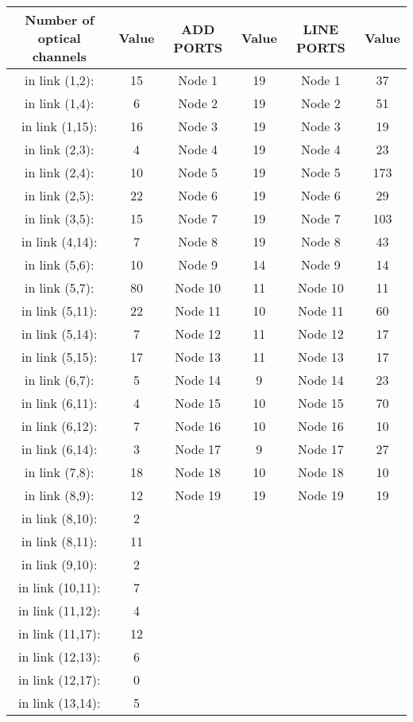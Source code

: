 \begin{table}[h!]
\centering
\begin{tabular}{|| c | c || c | c || c | c ||}
 \hline
 Number of optical channels & Value & ADD PORTS & Value & LINE PORTS & Value \\
 \hline\hline
in link (1,2): & 15& Node 1 & 19 & Node 1 & 37 \\
in link (1,4): & 6& Node 2 & 19 & Node 2 & 51 \\
in link (1,15): & 16& Node 3 & 19 & Node 3 & 19 \\
in link (2,3): & 4& Node 4 & 19 & Node 4 & 23 \\
in link (2,4): & 10& Node 5 & 19 & Node 5 & 173 \\
in link (2,5): & 22& Node 6 & 19 & Node 6 & 29 \\
in link (3,5): & 15& Node 7 & 19 & Node 7 & 103 \\
in link (4,14): & 7& Node 8 & 19 & Node 8 & 43 \\
in link (5,6): & 10& Node 9 & 14 & Node 9 & 14 \\
in link (5,7): & 80& Node 10 & 11 & Node 10 & 11 \\
in link (5,11): & 22& Node 11 & 10 & Node 11 & 60 \\
in link (5,14): & 7& Node 12 & 11 & Node 12 & 17 \\
in link (5,15): & 17& Node 13 & 11 & Node 13 & 17 \\
in link (6,7): & 5& Node 14 & 9 & Node 14 & 23 \\
in link (6,11): & 4& Node 15 & 10 & Node 15 & 70 \\
in link (6,12): & 7& Node 16 & 10 & Node 16 & 10 \\
in link (6,14): & 3& Node 17 & 9 & Node 17 & 27 \\
in link (7,8): & 18& Node 18 & 10 & Node 18 & 10 \\
in link (8,9): & 12& Node 19 & 19 & Node 19 & 19 \\
in link (8,10): & 2& & & & \\
in link (8,11): & 11& & & & \\
in link (9,10): & 2& & & & \\
in link (10,11): & 7& & & & \\
in link (11,12): & 4& & & & \\
in link (11,17): & 12& & & & \\
in link (12,13): & 6& & & & \\
in link (12,17): & 0& & & & \\
in link (13,14): & 5& & & & \\

\end{tabular}
\end{table}

